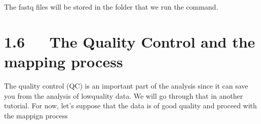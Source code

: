 \documentclass[letterpaper,10pt,english]{sphinxmanual}
\begin{document}
\sphinxAtStartPar
The fastq files will be stored in the folder that we run the command.


\chapter{1.6   The Quality Control and the mapping process}
\label{\detokenize{index:the-quality-control-and-the-mapping-process}}
\sphinxAtStartPar
The quality control (QC) is an important part of the analysis since it can save you from the analysis of low\sphinxhyphen{}quality data. We will go through that in another tutorial. For now, let’s suppose that the data is of good quality and proceed with the mappign process
\begin{quote}
\end{quote}



\renewcommand{\indexname}{Index}
\printindex
\end{document}
